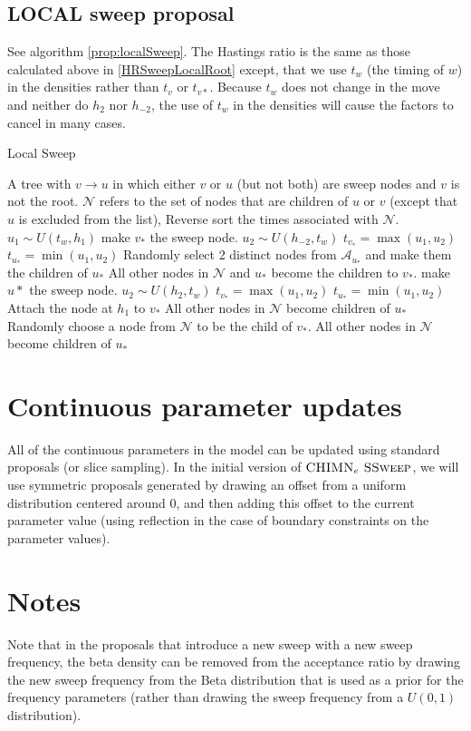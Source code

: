 \documentclass[letterpaper]{article}
\newcommand{\subscript}[1]{\ensuremath{_{#1}}}
\newcommand{\chimnesweep}[0]{\textsc{CHIMN\subscript{e} SSweep}}
\begin{document}
\subsection{LOCAL sweep proposal}
See algorithm \ref{prop:localSweep}.
The Hastings ratio is the same as those calculated above in \ref{HRSweepLocalRoot} except, that we use $t_w$ (the timing of $w$) in the densities rather than $t_v$ or $t_{v*}$.  
Because $t_w$ does not change in the move and neither do $h_2$ nor $h_{-2}$, the use of $t_w$ in the densities will cause the factors to cancel in many cases.
\begin{algorithm}[h]
\caption{Local Sweep}
\label{prop:localSweep} 
\begin{algorithmic}[1]
	\REQUIRE A tree with $v\rightarrow u$ in which either $v$ or $u$ (but not both) are sweep nodes and $v$ is not the root.
	\STATE $\mathcal{N}$ refers to the set of nodes that are children of $u$ or $v$ (except that $u$ is excluded from the list),
	\STATE Reverse sort the times associated with $\mathcal{N}$.
	\STATE $u_1\sim U(t_w, h_1)$
		\STATE make $v_*$ the sweep node.
		\STATE $u_2 \sim U(h_{-2}, t_w)$
		\STATE $t_{v_*} = \max(u_1,u_2)$
		\STATE $t_{u_*} = \min(u_1,u_2)$
		\STATE Randomly select 2 distinct nodes from $\mathcal{A}_{u_*}$ and make them the children of $u_*$
		\STATE All other nodes in $\mathcal{N}$  and $u_*$ become the children to $v_*$.
	\ELSE
		\STATE make $u*$ the sweep node.
		\STATE $u_2 \sim U(h_{2}, t_w)$
		\STATE $t_{v_*} = \max(u_1,u_2)$
		\STATE $t_{u_*} = \min(u_1,u_2)$
			\STATE Attach the node at $h_1$ to $v_*$
			\STATE All other nodes in $\mathcal{N}$ become children of $u_*$
		\ELSE
		  	\STATE Randomly choose a node from $\mathcal{N}$ to be the child of $v_*$.
			\STATE All other nodes in $\mathcal{N}$ become children of $u_*$
		\ENDIF
	\ENDIF
\end{algorithmic}
\end{algorithm} 


\section{Continuous parameter updates}
All of the continuous parameters in the model can be updated using standard proposals (or slice sampling).
In the initial version of $\chimnesweep$, we will use symmetric proposals generated by drawing an offset from a uniform distribution centered around 0, and then adding this offset to the current parameter value (using reflection in the case of boundary constraints on the parameter values).

\section{Notes}
Note that in  the proposals that introduce a new sweep with a new sweep frequency, the beta density can be removed from the acceptance ratio by drawing the new sweep frequency from the Beta distribution that is used as a prior for the frequency parameters (rather than drawing the sweep frequency from a $U(0,1)$ distribution).




 
\end{document}
